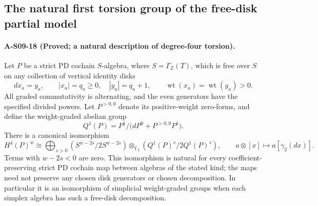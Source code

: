 \subsection{The natural first torsion group of the free-disk partial model}

\paragraph{A-S09-18 (Proved; a natural description of degree-four torsion).}
Let $P$ be a strict PD cochain $S$-algebra, where
$S=\Gamma_{\mathbb Z}(T)$, which is free over $S$
on any collection of vertical identity disks
\[
                  dx_a=y_a,
 \qquad |x_a|=q_a\geq0,\quad |y_a|=q_a+1,
 \qquad \operatorname{wt}(x_a)=\operatorname{wt}(y_a)>0.
 \tag{S09.78}
\]
All graded commutativity is alternating, and the even
generators have the specified divided powers.
Let $P^{>0,0}$ denote its positive-weight zero-forms,
and define the weight-graded abelian group
\[
 Q^1(P)=P^1\big/
             \bigl(dP^0+P^{>0,0}P^1\bigr).
 \tag{S09.79}
\]
There is a canonical isomorphism
\[
 H^4(P)^w\cong
 \bigoplus_{s>0}
 (S^{w-2s}/2S^{w-2s})\otimes_{\mathbb F_2}
                              (Q^1(P)^s/2Q^1(P)^s),
 \qquad
 a\otimes[x]\longmapsto a[\gamma_2(dx)].             \tag{S09.80}
\]
Terms with $w-2s<0$ are zero.  This isomorphism is
natural for every coefficient-preserving strict PD
cochain map between algebras of the stated kind;
the maps need not preserve any chosen disk generators
or chosen decomposition.  In particular it is an
isomorphism of simplicial weight-graded groups when
each simplex algebra has such a free-disk decomposition.

